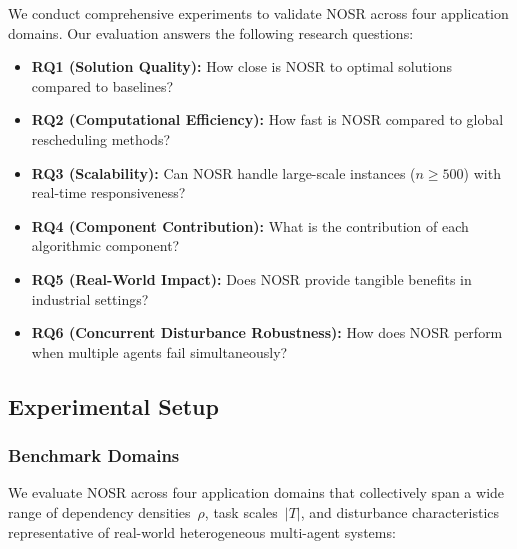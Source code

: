 \documentclass[manuscript,screen,review]{acmart}
\begin{document}
We conduct comprehensive experiments to validate NOSR across four application
domains. Our evaluation answers the following research questions:
\begin{itemize}
\item \textbf{RQ1 (Solution Quality):} How close is NOSR to optimal solutions
compared to baselines?
\item \textbf{RQ2 (Computational Efficiency):} How fast is NOSR compared to
global rescheduling methods?
\item \textbf{RQ3 (Scalability):} Can NOSR handle large-scale instances
($n \geq 500$) with real-time responsiveness?
\item \textbf{RQ4 (Component Contribution):} What is the contribution of each
algorithmic component?
\item \textbf{RQ5 (Real-World Impact):} Does NOSR provide tangible benefits in
industrial settings?
\item \textbf{RQ6 (Concurrent Disturbance Robustness):} How does NOSR perform
when multiple agents fail simultaneously?
\end{itemize}

\subsection{Experimental Setup}
\label{sec:setup}

\subsubsection{Benchmark Domains}

We evaluate NOSR across four application domains that collectively span a wide
range of dependency densities~$\rho$, task scales~$|T|$, and disturbance
characteristics representative of real-world heterogeneous multi-agent systems:
\end{document}
